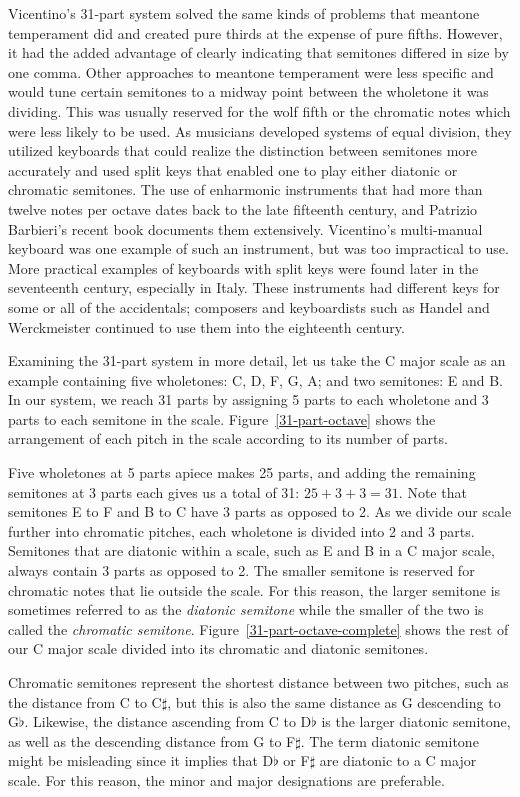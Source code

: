 Vicentino's 31-part system solved the same kinds of problems that meantone temperament did and created pure thirds at
the expense of pure fifths. However, it had the added advantage of clearly indicating that semitones differed in size by
one comma. Other approaches to meantone temperament were less specific and would tune certain semitones to a midway
point between the wholetone it was dividing. This was usually reserved for the wolf fifth or the chromatic notes which
were less likely to be used. As musicians developed systems of equal division, they utilized keyboards that could
realize the distinction between semitones more accurately and used split keys that enabled one to play either diatonic
or chromatic semitones. The use of enharmonic instruments that had more than twelve notes per octave dates back to the
late fifteenth century, and Patrizio Barbieri's recent book documents them extensively.\autocite{PB:1} Vicentino's
multi-manual keyboard was one example of such an instrument, but was too impractical to use. More practical examples of
keyboards with split keys were found later in the seventeenth century, especially in Italy. These instruments had
different keys for some or all of the accidentals; composers and keyboardists such as Handel and Werckmeister continued
to use them into the eighteenth century. \autocite[108]{MB:1}

Examining the 31-part system in more detail, let us take the C major scale as an example containing
five wholetones: C, D, F, G, A; and two semitones: E and B. In our system, we reach 31 parts by
assigning 5 parts to each wholetone and 3 parts to each semitone in the scale. 
Figure~\ref{31-part-octave} shows the arrangement of each pitch in the scale according to its number of parts.
 
Five wholetones at 5 parts apiece makes 25 parts, and adding
the remaining semitones at 3 parts each gives us a total of 31: $ 25 + 3 + 3 = 31 $. Note that
semitones E to F and B to C have 3 parts as opposed to 2. As we divide our scale further into
chromatic pitches, each wholetone is divided into 2 and 3 parts. Semitones that are diatonic within
a scale, such as E and B in a C major scale, always contain 3 parts as opposed to 2. The smaller
semitone is reserved for chromatic notes that lie outside the scale. For this reason, the larger
semitone is sometimes referred to as the \textit{diatonic semitone} while the smaller of the two is
called the \textit{chromatic semitone}. Figure~\ref{31-part-octave-complete} shows the rest of our C
major scale divided into its chromatic and diatonic semitones. 
 
Chromatic semitones represent the shortest distance between two pitches, such as the
distance from C to C$\sharp$, but this is also the same distance as G descending to G$\flat$.
Likewise, the distance ascending from C to D$\flat$ is the larger diatonic semitone, as well as the
descending distance from G to F$\sharp$. The term diatonic semitone might be misleading since it
implies that D$\flat$ or F$\sharp$ are diatonic to a C major scale. For this reason, the minor and
major designations are preferable.

